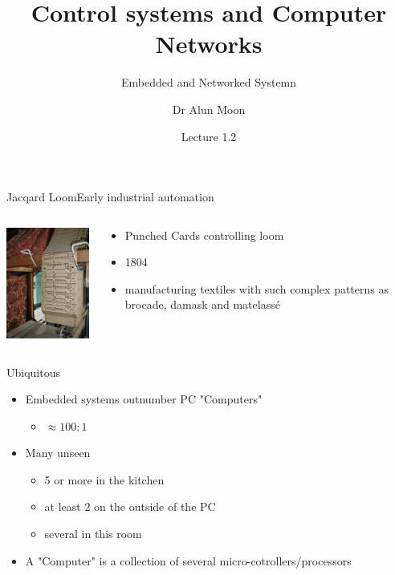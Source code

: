 \documentclass[xcolor=svgnames]{beamer}
\title{Control systems and Computer Networks}
\subtitle{Embedded and Networked Systemn}
\author{Dr Alun Moon}
\date{Lecture 1.2}
\begin{document}
\frame{\maketitle}

\begin{frame}{Jacqard Loom}{Early industrial automation}
\begin{columns}[onlytextwidth]
\begin{column}{.6\textwidth}
    \includegraphics{Jacquard-loom-cards.png}
\end{column}
\begin{column}{.4\textwidth}
    \begin{itemize}
        \item Punched Cards controlling loom
        \item 1804
        \item manufacturing textiles with such complex patterns as brocade, damask and matelassé
    \end{itemize}
\end{column}
\end{columns}
\end{frame}



\begin{frame}{Ubiquitous }
    \begin{itemize}[<+->]
        \item Embedded systems outnumber PC "Computers"
        \begin{itemize}
            \item $\approx 100 : 1$
        \end{itemize}
        \item Many unseen
        \begin{itemize}
            \item 5 or more in the kitchen
            \item at least 2 on the outside of the PC
            \item several in this room
        \end{itemize}
        \item A "Computer" is a collection of several micro-cotrollers/processors
    \end{itemize}
\end{frame}
\end{document}

